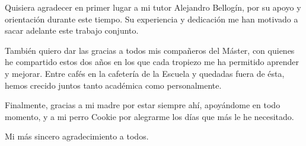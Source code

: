 Quisiera agradecer en primer lugar a mi tutor Alejandro Bellogín, por su apoyo y orientación durante este tiempo. Su experiencia y dedicación me han motivado a sacar adelante este trabajo conjunto.

También quiero dar las gracias a todos mis compañeros del Máster, con quienes he compartido estos dos años en los que cada tropiezo me ha permitido aprender y mejorar. Entre cafés en la cafetería de la Escuela y quedadas fuera de ésta, hemos crecido juntos tanto académica como personalmente.

Finalmente, gracias a mi madre por estar siempre ahí, apoyándome en todo momento, y a mi perro Cookie por alegrarme los días que más le he necesitado.

Mi más sincero agradecimiento a todos.